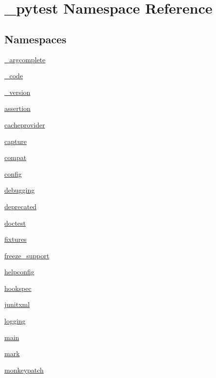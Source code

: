 \hypertarget{namespace__pytest}{}\section{\+\_\+pytest Namespace Reference}
\label{namespace__pytest}
\subsection*{Namespaces}
\begin{DoxyCompactItemize}
\item 
 \hyperlink{namespace__pytest_1_1__argcomplete}{\+\_\+argcomplete}
\item 
 \hyperlink{namespace__pytest_1_1__code}{\+\_\+code}
\item 
 \hyperlink{namespace__pytest_1_1__version}{\+\_\+version}
\item 
 \hyperlink{namespace__pytest_1_1assertion}{assertion}
\item 
 \hyperlink{namespace__pytest_1_1cacheprovider}{cacheprovider}
\item 
 \hyperlink{namespace__pytest_1_1capture}{capture}
\item 
 \hyperlink{namespace__pytest_1_1compat}{compat}
\item 
 \hyperlink{namespace__pytest_1_1config}{config}
\item 
 \hyperlink{namespace__pytest_1_1debugging}{debugging}
\item 
 \hyperlink{namespace__pytest_1_1deprecated}{deprecated}
\item 
 \hyperlink{namespace__pytest_1_1doctest}{doctest}
\item 
 \hyperlink{namespace__pytest_1_1fixtures}{fixtures}
\item 
 \hyperlink{namespace__pytest_1_1freeze__support}{freeze\+\_\+support}
\item 
 \hyperlink{namespace__pytest_1_1helpconfig}{helpconfig}
\item 
 \hyperlink{namespace__pytest_1_1hookspec}{hookspec}
\item 
 \hyperlink{namespace__pytest_1_1junitxml}{junitxml}
\item 
 \hyperlink{namespace__pytest_1_1logging}{logging}
\item 
 \hyperlink{namespace__pytest_1_1main}{main}
\item 
 \hyperlink{namespace__pytest_1_1mark}{mark}
\item 
 \hyperlink{namespace__pytest_1_1monkeypatch}{monkeypatch}
\item 

\end{DoxyCompactItemize}
